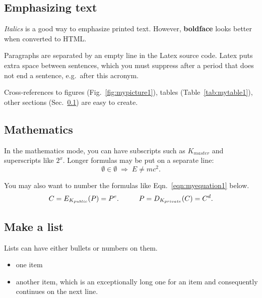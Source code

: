 \documentclass[a4paper,12pt]{article}
\begin{document}


\subsection{Emphasizing text}\label{sec:emphasis}

\textit{Italics} is a good way to emphasize printed text. However,
\textbf{boldface} looks better when converted to HTML.

Paragraphs are separated by an empty line in the Latex source code.
Latex puts extra space between sentences, which you must suppress
after a period that does not end a sentence, e.g.\ after this acronym.

Cross-references to figures (Fig.~\ref{fig:mypicture1}), tables
(Table~\ref{tab:mytable1}), other sections (Sec.~\ref{sec:emphasis})
are easy to create. 




\subsection{Mathematics}\label{sec:math}

In the mathematics mode, you can have subscripts such as $K_{master}$
and superscripts like $2^x$. Longer formulas may be put on a separate
line:
\[ \emptyset \in \emptyset \; \Rightarrow \; E \neq mc^2. \]

You may also want to number the formulas like Eqn.~\ref{eqn:myequation1}
below.
\begin{equation}\label{eqn:myequation1}
C = E_{K_{public}}(P) = P^e. \hspace{10mm}   P = D_{K_{private}}(C) = C^d.
\end{equation}





\subsection{Make a list}\label{sec:list}

Lists can have either bullets or numbers on them. 

\begin{itemize}
\item one item
\item another item, which is an exceptionally long one for an item
  and consequently continues on the next line.
\end{itemize}
\end{document}
